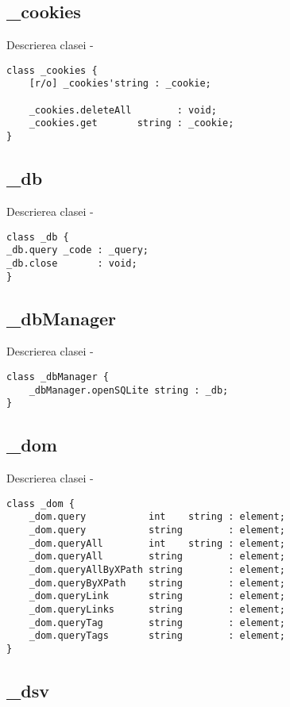 \subsection{{\color{orange} \_cookies}}

\noindent Descrierea clasei  -
\begin{lstlisting}[numbers=none]
class _cookies {
	[r/o] _cookies'string : _cookie;

	_cookies.deleteAll        : void;
	_cookies.get       string : _cookie;
}
\end{lstlisting}

\subsection{{\color{orange} \_db}}

\noindent Descrierea clasei  -
\begin{lstlisting}[numbers=none]
class _db {
_db.query _code : _query;
_db.close       : void;
}
\end{lstlisting}

\subsection{{\color{orange} \_dbManager}}

\noindent Descrierea clasei  -
\begin{lstlisting}[numbers=none]
class _dbManager {
	_dbManager.openSQLite string : _db;
}
\end{lstlisting}

\subsection{{\color{orange} \_dom}}

\noindent Descrierea clasei  -
\begin{lstlisting}[numbers=none]
class _dom {
	_dom.query           int    string : element;
	_dom.query           string        : element;
	_dom.queryAll        int    string : element;
	_dom.queryAll        string        : element;
	_dom.queryAllByXPath string        : element;
	_dom.queryByXPath    string        : element;
	_dom.queryLink       string        : element;
	_dom.queryLinks      string        : element;
	_dom.queryTag        string        : element;
	_dom.queryTags       string        : element;
}
\end{lstlisting}

\subsection{{\color{orange} \_dsv}}

